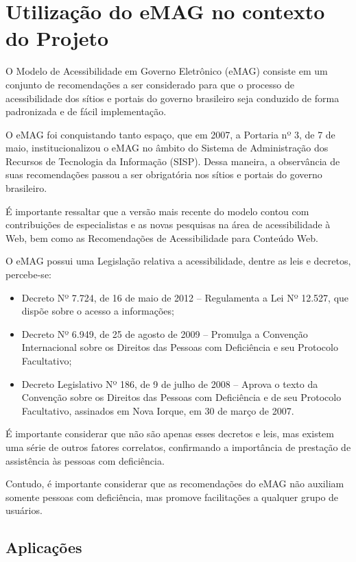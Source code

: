 \chapter[Utilização do eMAG no contexto do Projeto]{Utilização do eMAG no contexto do Projeto}
\label{chap:emag}

	O Modelo de Acessibilidade em Governo Eletrônico (eMAG) consiste em um conjunto de recomendações a ser considerado para que o processo de acessibilidade dos sítios e portais do governo brasileiro seja conduzido de forma padronizada e de fácil implementação.
	
	O eMAG foi conquistando tanto espaço, que em 2007, a Portaria nº 3, de 7 de maio, institucionalizou o eMAG no âmbito do Sistema de Administração dos Recursos de Tecnologia da Informação (SISP). Dessa maneira, a observância de suas recomendações passou a ser obrigatória nos sítios e portais do governo brasileiro.
	
	É importante ressaltar que a versão mais recente do modelo contou com contribuições de especialistas e as novas pesquisas na área de acessibilidade à Web, bem como as Recomendações de Acessibilidade para Conteúdo Web.

	O eMAG possui uma Legislação relativa a acessibilidade, dentre as leis e decretos, percebe-se:

	\begin{itemize}
		\item{Decreto Nº 7.724, de 16 de maio de 2012 – Regulamenta a Lei Nº 12.527, que dispõe sobre o acesso a informações;}
		\item{Decreto Nº 6.949, de 25 de agosto de 2009 – Promulga a Convenção Internacional sobre os Direitos das Pessoas com Deficiência e seu Protocolo Facultativo;}
		\item{Decreto Legislativo Nº 186, de 9 de julho de 2008 – Aprova o texto da Convenção sobre os Direitos das Pessoas com Deficiência e de seu Protocolo Facultativo, assinados em Nova Iorque, em 30 de março de 2007.}
	\end{itemize}

	É importante considerar que não são apenas esses decretos e leis, mas existem uma série de outros fatores correlatos, confirmando a importância de prestação de assistência às pessoas com deficiência.

	Contudo, é importante considerar que as recomendações do eMAG não auxiliam somente pessoas com deficiência, mas promove facilitações a qualquer grupo de usuários.

	\section[Aplicações]{Aplicações}
	\label{sec:emag_aplicacoes}

